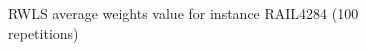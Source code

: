 \begin{figure}[H]
	\centering%
	\caption{RWLS average weights value for instance RAIL4284 (100 repetitions)}%
\end{figure}

